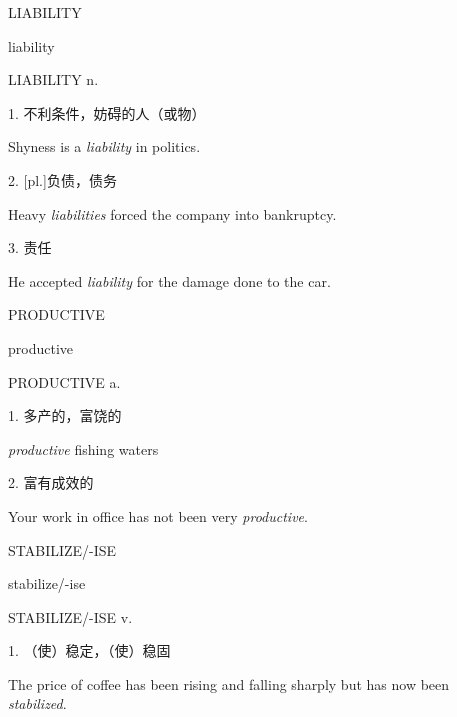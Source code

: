 \begin{flashcard}{
LIABILITY

liability
}
\begin{center}
LIABILITY n. 
\end{center}
1. 不利条件，妨碍的人（或物）

Shyness is a \textit{liability} in politics.

2. [pl.]负债，债务

Heavy \textit{liabilities} forced the company into bankruptcy.

3. 责任

He accepted \textit{liability} for the damage done to the car.

\end{flashcard}
\begin{flashcard}{
PRODUCTIVE

productive
}
\begin{center}
PRODUCTIVE a. 
\end{center}
1. 多产的，富饶的

\textit{productive} fishing waters

2. 富有成效的

Your work in office has not been very \textit{productive}.

\end{flashcard}
\begin{flashcard}{
STABILIZE/-ISE

stabilize/-ise
}
\begin{center}
STABILIZE/-ISE v. 
\end{center}
1. （使）稳定，（使）稳固

The price of coffee has been rising and falling sharply but has now been \textit{stabilized}.

\end{flashcard}
